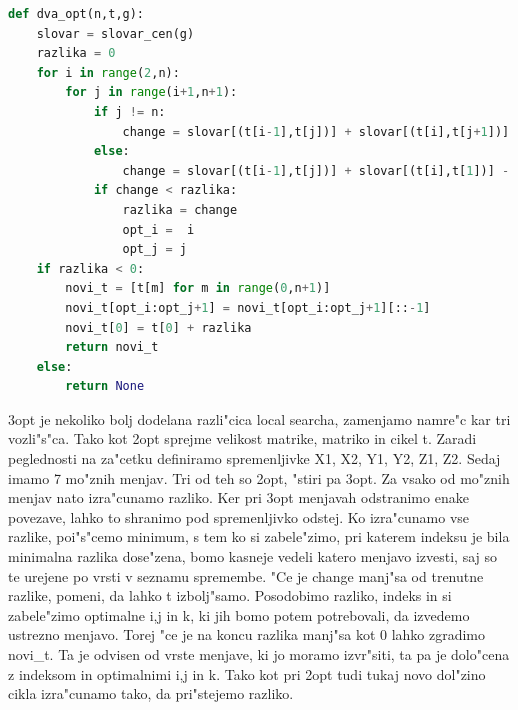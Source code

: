 \documentclass[12pt,a4paper]{amsart}
\theoremstyle{definition} %
\theoremstyle{plain} %
\begin{document}
\begin{lstlisting}[language=Python]
def dva_opt(n,t,g):
    slovar = slovar_cen(g)
    razlika = 0
    for i in range(2,n):
        for j in range(i+1,n+1):
            if j != n:
                change = slovar[(t[i-1],t[j])] + slovar[(t[i],t[j+1])] - slovar[(t[i-1],t[i])] - slovar[(t[j],t[j+1])]
            else:
                change = slovar[(t[i-1],t[j])] + slovar[(t[i],t[1])] - slovar[(t[i-1],t[i])] - slovar[(t[j],t[1])]               
            if change < razlika:
                razlika = change
                opt_i =  i
                opt_j = j
    if razlika < 0:
        novi_t = [t[m] for m in range(0,n+1)]
        novi_t[opt_i:opt_j+1] = novi_t[opt_i:opt_j+1][::-1]
        novi_t[0] = t[0] + razlika        
        return novi_t
    else:
        return None
\end{lstlisting}

3opt je nekoliko bolj dodelana razli"cica local searcha, zamenjamo namre"c kar tri vozli"s"ca. Tako kot 2opt sprejme velikost matrike, 
matriko in cikel t. Zaradi peglednosti na za"cetku definiramo spremenljivke X1, X2, Y1, Y2, Z1, Z2. Sedaj imamo 7 mo"znih menjav. Tri od teh so 2opt, "stiri pa 3opt. Za vsako od mo"znih menjav nato izra"cunamo razliko. Ker pri 3opt menjavah odstranimo enake povezave, lahko to shranimo pod spremenljivko odstej. Ko izra"cunamo vse razlike, poi"s"cemo minimum, s tem ko si zabele"zimo, pri katerem indeksu je bila minimalna razlika dose"zena, bomo kasneje vedeli katero menjavo izvesti, saj so te urejene po vrsti v seznamu spremembe. "Ce je change manj"sa od trenutne razlike, pomeni, da lahko t izbolj"samo. Posodobimo razliko, indeks in si zabele"zimo optimalne i,j in k, ki jih bomo potem potrebovali, da izvedemo ustrezno menjavo. Torej "ce je na koncu razlika manj"sa kot 0 lahko zgradimo novi\_t. Ta je odvisen od vrste menjave, ki jo moramo izvr"siti, ta pa je dolo"cena z indeksom in optimalnimi i,j in k. Tako kot pri 2opt tudi tukaj novo dol"zino cikla izra"cunamo tako, da pri"stejemo razliko. 
\end{document}
